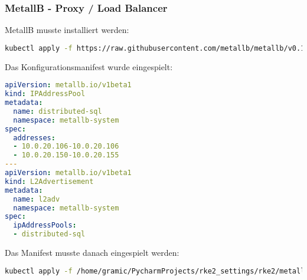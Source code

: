 \subsubsection{MetallB - Proxy / Load Balancer}
MetallB musste installiert werden:
\lstset{style=gra_codestyle}
\begin{lstlisting}[language=bash, caption=MetallB installieren,captionpos=b,label={lst:metallb-install},breaklines=true]
kubectl apply -f https://raw.githubusercontent.com/metallb/metallb/v0.14.4/config/manifests/metallb-native.yaml
\end{lstlisting}

Das Konfigurationsmanifest wurde eingespielt:
\lstset{style=gra_codestyle}
\begin{lstlisting}[language=yaml, caption=MetallB konfigurieren,captionpos=b,label={lst:metallb-config},breaklines=true]
apiVersion: metallb.io/v1beta1
kind: IPAddressPool
metadata:
  name: distributed-sql
  namespace: metallb-system
spec:
  addresses:
  - 10.0.20.106-10.0.20.106
  - 10.0.20.150-10.0.20.155
---
apiVersion: metallb.io/v1beta1
kind: L2Advertisement
metadata:
  name: l2adv
  namespace: metallb-system
spec:
  ipAddressPools:
  - distributed-sql
\end{lstlisting}

Das Manifest musste danach eingespielt werden:
\lstset{style=gra_codestyle}
\begin{lstlisting}[language=bash, caption=MetallB Konfiguration einspielen,captionpos=b,label={lst:metallb-apply},breaklines=true]
kubectl apply -f /home/gramic/PycharmProjects/rke2_settings/rke2/metallb-values.yaml
\end{lstlisting}

